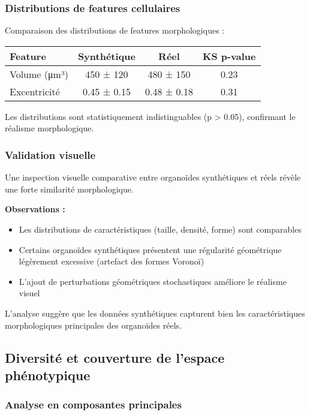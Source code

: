 \subsubsection{Distributions de features cellulaires}

Comparaison des distributions de features morphologiques :

\begin{center}
\begin{tabular}{|l|c|c|c|}
\hline
\textbf{Feature} & \textbf{Synthétique} & \textbf{Réel} & \textbf{KS p-value} \\
\hline
Volume (μm³) & 450 ± 120 & 480 ± 150 & 0.23 \\
Excentricité & 0.45 ± 0.15 & 0.48 ± 0.18 & 0.31 \\
\hline
\end{tabular}
\end{center}

Les distributions sont statistiquement indistinguables (p > 0.05), confirmant le réalisme morphologique.

\subsubsection{Validation visuelle}

Une inspection visuelle comparative entre organoïdes synthétiques et réels révèle une forte similarité morphologique.

\textbf{Observations :}
\begin{itemize}
    \item Les distributions de caractéristiques (taille, densité, forme) sont comparables
    \item Certains organoïdes synthétiques présentent une régularité géométrique légèrement excessive (artefact des formes Voronoï)
    \item L'ajout de perturbations géométriques stochastiques améliore le réalisme visuel
\end{itemize}

L'analyse suggère que les données synthétiques capturent bien les caractéristiques morphologiques principales des organoïdes réels.

\subsection{Diversité et couverture de l'espace phénotypique}

\subsubsection{Analyse en composantes principales}


